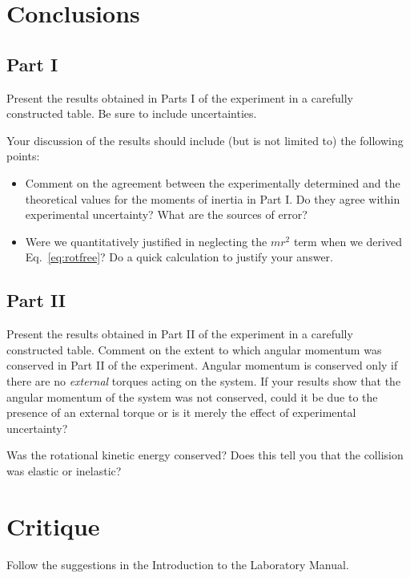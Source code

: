 \section*{Conclusions}
\subsection*{Part I}
Present the results obtained in Parts I of the experiment in a
carefully constructed table.  Be sure to include uncertainties.

Your discussion of the results should include (but is not limited to)
the following points:
\begin{itemize}
\item Comment on the agreement between the experimentally determined
and the
theoretical values for the moments of inertia in Part I.  Do they
agree within experimental uncertainty?  What are the sources of error?
\item Were we quantitatively justified in neglecting the $mr^2$ term
when we derived Eq.~\ref{eq:rotfree}?  Do a quick calculation to
justify your answer.
\end{itemize}

\subsection*{Part II}
Present the results obtained in Part II of the experiment in a
carefully constructed table.
Comment on the extent to which angular momentum was conserved in Part II of the
experiment.  Angular momentum is  conserved only if there are no {\em
external}
torques acting on the system.  If your results show that the angular momentum
of the system was not conserved, could it be due to the presence of an
external torque or is it merely the effect of experimental
uncertainty?

Was the rotational
kinetic energy conserved?  Does this tell you that the collision was elastic
or inelastic?

\section*{Critique}
Follow the suggestions in the Introduction to the Laboratory Manual.
